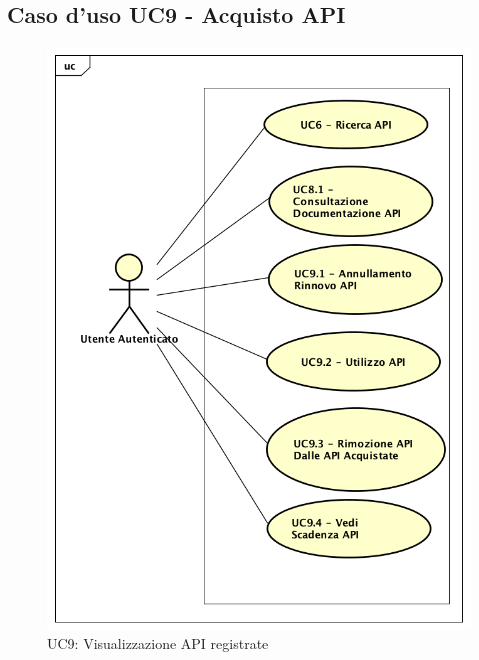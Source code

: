 \newpage
\subsection{Caso d'uso UC9 - Acquisto API}
\label{UC9}
\begin{figure}[ht]
	\centering
	\includegraphics[scale=0.45]{UML/UC9.png}
	\caption{UC9: Visualizzazione API registrate}
\end{figure}

